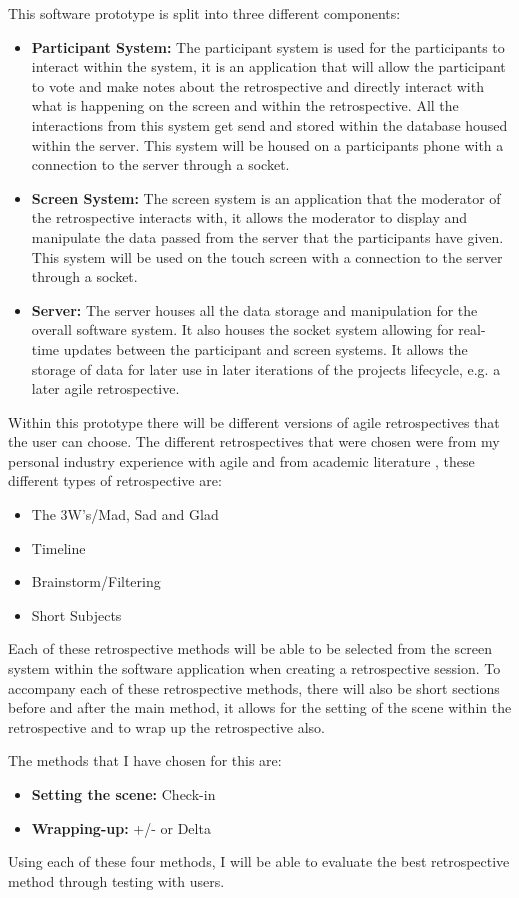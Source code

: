 This software prototype is split into three different components:
\begin{itemize}
\item \textbf{Participant System:} The participant system is used for the participants to interact within the system, it is an application that will allow the participant to vote and make notes about the retrospective and directly interact with what is happening on the screen and within the retrospective. All the interactions from this system get send and stored within the database housed within the server. This system will be housed on a participants phone with a connection to the server through a socket.
\item \textbf{Screen System:} The screen system is an application that the moderator of the retrospective interacts with, it allows the moderator to display and manipulate the data passed from the server that the participants have given. This system will be used on the touch screen with a connection to the server through a socket.  
\item \textbf{Server:} The server houses all the data storage and manipulation for the overall software system. It also houses the socket system allowing for real-time updates between the participant and screen systems. It allows the storage of data for later use in later iterations of the projects lifecycle, e.g. a later agile retrospective. 
\end{itemize}

Within this prototype there will be different versions of agile retrospectives that the user can choose. The different retrospectives that were chosen were from my personal industry experience with agile and from academic literature \cite{AgileRetrospectivesEstherDerby} \cite{normanKeith}, these different types of retrospective are:
\begin{itemize}
\item The 3W's/Mad, Sad and Glad
\item Timeline
\item Brainstorm/Filtering
\item Short Subjects
\end{itemize}

Each of these retrospective methods will be able to be selected from the screen system within the software application when creating a retrospective session. To accompany each of these retrospective methods, there will also be short sections before and after the main method, it allows for the setting of the scene within the retrospective and to wrap up the retrospective also.

The methods that I have chosen for this are:  \cite{AgileRetrospectivesEstherDerby}
\begin{itemize}
\item \textbf{Setting the scene:} Check-in
\item \textbf{Wrapping-up:} +/- or Delta
\end{itemize}

Using each of these four methods, I will be able to evaluate the best retrospective method through testing with users.
